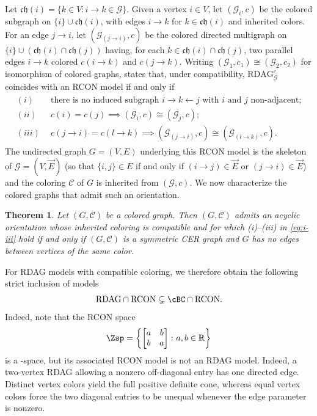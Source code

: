 \documentclass[12pt]{amsart}
\theoremstyle{plain}
\newtheorem{theorem}{Theorem}[section]
\theoremstyle{definition}
\theoremstyle{remark}
\newcommand{\R}{\mathbb{R}}
\newcommand{\1}{\mathbf{1}}
\def\ch{{\mathfrak{ch}}}
\begin{document}
Let $\ch(i) = \{k\in V\colon i\to k\in\mathcal{G}\}$. Given a vertex $i\in V$, let $(\mathcal{G}_i,c)$ be the colored subgraph on $\{i\}\cup\ch(i)$, with edges $i\to k$ for $k\in\ch(i)$ and inherited colors. For an edge $j\to i$, let $(\mathcal{G}_{(j\to i)},c)$ be the colored directed multigraph on $\{i\}\cup (\ch(i)\cap\ch(j))$ having, for each $k\in\ch(i)\cap\ch(j)$, two parallel edges $i\to k$ colored $c(i\to k)$ and $c(j\to k)$. Writing $(\mathcal{G}_1,c_1)\cong(\mathcal{G}_2,c_2)$ for isomorphism of colored graphs, \citet[Theorem~3.4]{Seigal23} states that, under compatibility,
$\mathrm{RDAG}_{\mathcal{G}}^c$ coincides with an RCON model if and only if
\begin{align}\label{eq:i-iii}
\begin{split}
(i)\ & \ \mbox{there is no induced subgraph $i\to k\leftarrow j$ with $i$ and $j$ non-adjacent;}\\
(ii)\ & \ c(i)=c(j)\implies (\mathcal{G}_i,c)\cong (\mathcal{G}_j,c);\\
(iii)\ & \ c(j\to i)=c(l\to k)\implies (\mathcal{G}_{(j\to i)},c)\cong (\mathcal{G}_{(l\to k)},c).
\end{split}
\end{align}
The undirected graph $G=(V,E)$  underlying this RCON model is the skeleton of $\mathcal{G}=(V,\vec{E})$ (so that $\{i,j\}\in E$ if and only if $(i\to j)\in\vec{E}$ or $(j\to i)\in\vec{E}$) and the coloring $\mathcal{C}$ of $G$ is inherited from $(\mathcal{G},c)$. 
We now characterize the colored graphs that admit such an orientation.

\begin{theorem}\label{thm:RDAG}
Let $(G,\mathcal C)$ be a colored graph.
Then $(G,\mathcal C)$ admits an acyclic orientation whose inherited
coloring is compatible and for which (i)--(iii) in \eqref{eq:i-iii}
hold if and only if $(G,\mathcal C)$ is a symmetric CER graph and
$G$ has no edges between vertices of the same color.
\end{theorem}

For RDAG models with compatible coloring, we therefore obtain
the following strict inclusion of models
\[
\mathrm{RDAG}\cap \mathrm{RCON} \subsetneq \mathrm{\cBC}\cap \mathrm{RCON}.
\]
Indeed, note that the RCON space
\[
\Zsp = \left\{ \begin{bmatrix}
    a & b \\ b & a
\end{bmatrix}\colon a,b\in\R \right\}
\]
is a \cBC-space, but its associated RCON model is not an RDAG model.
Indeed, a two-vertex RDAG allowing a nonzero off-diagonal entry has
one directed edge. Distinct vertex colors yield the full positive
definite cone, whereas equal vertex colors force the two diagonal
entries to be unequal whenever the edge parameter is nonzero.
\end{document}
